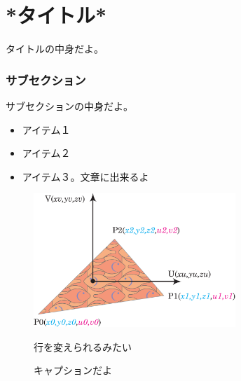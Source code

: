 \chapter{*タイトル*}
\label{*Ltitle*}

タイトルの中身だよ。

\subsection{サブセクション}
\label{*Lsubsection*}

サブセクション\cite{*AuthorName*}の中身だよ。 %



\begin{itemize}
\item アイテム１
\item アイテム２
\item アイテム３。文章に出来るよ
\end{itemize}

\begin{figure}[h]
  \centering
  \includegraphics[width=3.0in]{./img/polygon_explain}
  \caption{キャプションだよ}{行を変えられるみたい}
  \label{test} %
\end{figure}
 
